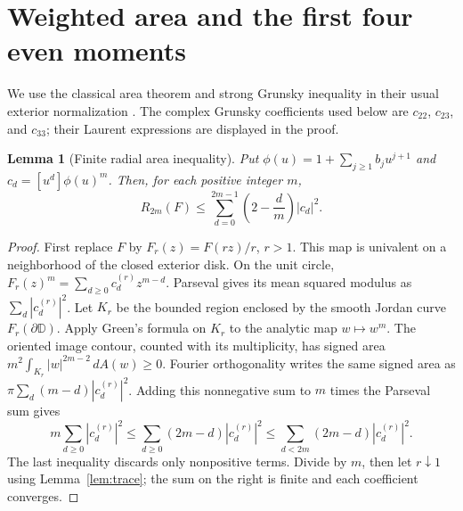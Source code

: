 \documentclass[11pt]{article}
\newtheorem{lemma}[theorem]{Lemma}
\newcommand{\D}{\mathbb D}
\begin{document}
	\section{Weighted area and the first four even moments}
	We use the classical area theorem and strong Grunsky inequality in their
	usual exterior normalization \cite[Chapters 1 and 3]{Pom}. The complex
	Grunsky coefficients used below are $c_{22}$, $c_{23}$, and $c_{33}$;
	their Laurent expressions are displayed in the proof.
	
	\begin{lemma}[Finite radial area inequality]\label{lem:area}
		Put $\phi(u)=1+\sum_{j\ge1}b_ju^{j+1}$ and
		$c_d=[u^d]\phi(u)^m$. Then, for each positive integer $m$,
		\begin{equation}\label{eq:rad-area}
			R_{2m}(F)\le \sum_{d=0}^{2m-1}\left(2-\frac dm\right)|c_d|^2.
		\end{equation}
	\end{lemma}
	\begin{proof}
		First replace $F$ by $F_r(z)=F(rz)/r$, $r>1$. This map is univalent on
		a neighborhood of the closed exterior disk. On the unit circle,
		$F_r(z)^m=\sum_{d\ge0}c_d^{(r)}z^{m-d}$. Parseval gives its mean squared
		modulus as $\sum_d|c_d^{(r)}|^2$. Let $K_r$ be the bounded region
		enclosed by the smooth Jordan curve $F_r(\partial\D)$. Apply Green's
		formula on $K_r$ to the analytic map $w\mapsto w^m$. The oriented image
		contour, counted with its multiplicity, has signed area
		$m^2\int_{K_r}|w|^{2m-2}\,dA(w)\ge0$. Fourier orthogonality writes the
		same signed area as
		$\pi\sum_d(m-d)|c_d^{(r)}|^2$. Adding this nonnegative sum to $m$ times
		the Parseval sum gives
		\[
		m\sum_{d\ge0}|c_d^{(r)}|^2
		\le\sum_{d\ge0}(2m-d)|c_d^{(r)}|^2
		\le\sum_{d<2m}(2m-d)|c_d^{(r)}|^2.
		\]
		The last inequality discards only nonpositive terms. Divide by $m$,
		then let $r\downarrow1$ using Lemma~\ref{lem:trace}; the sum on the
		right is finite and each coefficient converges.
	\end{proof}
	
\end{document}
